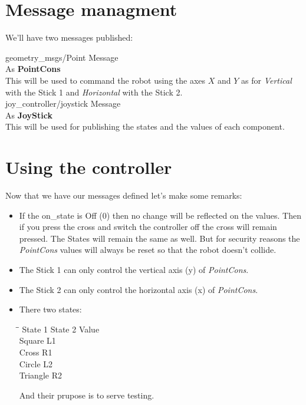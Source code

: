 \documentclass[letterpaper, openright, 11pt]{article}
\begin{document}
\pagestyle{fancy}

\section{Message managment}

We'll have two messages published:
\begin{center}
\begin{multicols}{2}
\noindent \Large geometry\_msgs/Point Message\\
\normalsize As \textbf{PointCons}\\
This will be used to command the robot using the axes $X$ and $Y$ as for \textit{Vertical} with the Stick 1 and \textit{Horizontal} with the Stick 2.\\
\Large joy\_controller/joystick Message\\
\normalsize As \textbf{JoyStick}\\
This will be used for publishing the states and the values of each component.
\end{multicols}
\end{center}

\section{Using the controller}

Now that we have our messages defined let's make some remarks:
\begin{itemize}
\item If the on\_state is Off (0) then no change  will be reflected on the values. Then if you press the cross and switch the controller off the cross will remain pressed. The States will remain the same as well. But for security reasons the \textit{PointCons} values will always be reset so that the robot doesn't collide.
\item The Stick 1 can only control the vertical axis (y) of \textit{PointCons}.
\item The Stick 2 can only control the horizontal axis (x) of \textit{PointCons}.
\item There two states:
\begin{tabbing}
\hspace{4cm}\=\hspace{4cm}\=\kill
 State 1 \> State 2 \> Value \\ 
 Square \> L1 \\
 Cross \> R1 \\ 
 Circle \>  L2 \\ 
 Triangle \> R2 
\end{tabbing} 
And their prupose is to serve testing.
\end{itemize}
\end{document}
